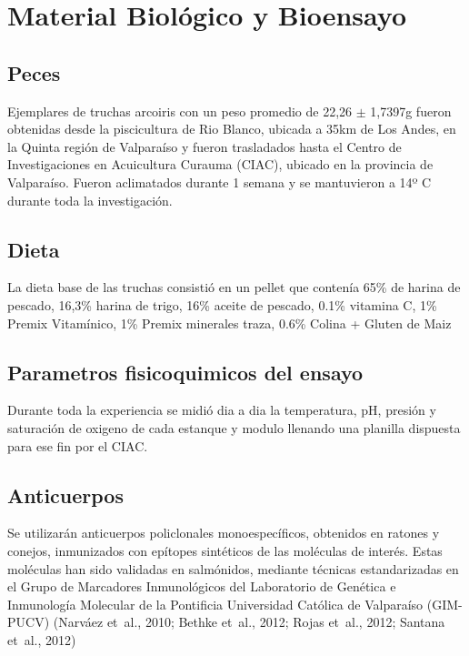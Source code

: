 \documentclass[12pt,letterpaper,oneside]{scrbook}
\begin{document}
\section{Material Biológico y Bioensayo}\subsection{Peces}

Ejemplares de truchas arcoiris con un peso promedio de 22,26 \(\pm\)
1,7397g fueron obtenidas desde la piscicultura de Rio Blanco, ubicada a
35km de Los Andes, en la Quinta región de Valparaíso y fueron
trasladados hasta el Centro de Investigaciones en Acuicultura Curauma
(CIAC), ubicado en la provincia de Valparaíso. Fueron aclimatados
durante 1 semana y se mantuvieron a 14º C durante toda la investigación.

\subsection{Dieta}

La dieta base de las truchas consistió en un pellet que contenía 65\% de
harina de pescado, 16,3\% harina de trigo, 16\% aceite de pescado, 0.1\%
vitamina C, 1\% Premix Vitamínico, 1\% Premix minerales traza, 0.6\%
Colina + Gluten de Maiz

\subsection{Parametros fisicoquimicos del ensayo}

Durante toda la experiencia se midió dia a dia la temperatura, pH,
presión y saturación de oxigeno de cada estanque y modulo llenando una
planilla dispuesta para ese fin por el CIAC.

\subsection{Anticuerpos}

Se utilizarán anticuerpos policlonales monoespecíficos, obtenidos en
ratones y conejos, inmunizados con epítopes sintéticos de las moléculas
de interés. Estas moléculas han sido validadas en salmónidos, mediante
técnicas estandarizadas en el Grupo de Marcadores Inmunológicos del
Laboratorio de Genética e Inmunología Molecular de la Pontificia
Universidad Católica de Valparaíso (GIM-PUCV) (Narváez et~al., 2010;
Bethke et~al., 2012; Rojas et~al., 2012; Santana et~al., 2012)
\end{document}
